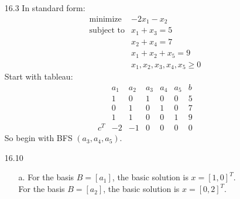 \documentclass{article}
\begin{document}
\begin{itemize}
	\item[16.3] In standard form:
		\begin{displaymath}
			\begin{array}{rl}
				\textrm{minimize} & -2x_1 - x_2 \\
				\textrm{subject to} & x_1 + x_3 = 5 \\
				& x_2 + x_4 = 7 \\
				& x_1 + x_2 + x_5 = 9 \\
				& x_1, x_2, x_3, x_4, x_5 \ge 0
			\end{array}
		\end{displaymath}
		Start with tableau:
		\begin{displaymath}
			\begin{array}{ccccccc}
				& a_1 & a_2 & a_3 & a_4 & a_5 & b \\
				& 1 & 0 & 1 & 0 & 0 & 5 \\
				& 0 & 1 & 0 & 1 & 0 & 7 \\
				& 1 & 1 & 0 & 0 & 1 & 9 \\
				c^T & -2 & -1 & 0 & 0 & 0 & 0
			\end{array}
		\end{displaymath}
		So begin with BFS $(a_3, a_4, a_5)$.
	\item[16.10]
		\begin{itemize}
			\item [a.]
				For the basis $B = [a_1]$, the basic solution is $x = [1, 0]^T$. \\
				For the basis $B = [a_2]$, the basic solution is $x = [0, 2]^T$.
		\end{itemize}
\end{itemize}
\end{document}
